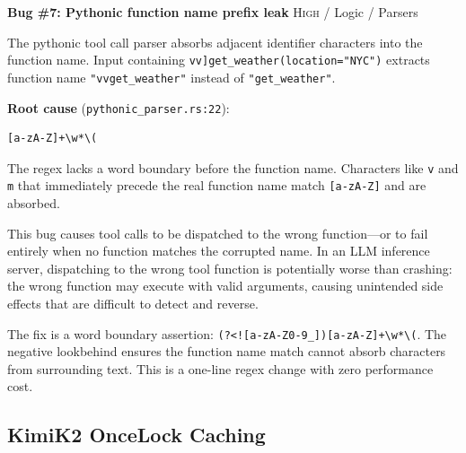 \begin{bugbox}
\textbf{Bug \#7: Pythonic function name prefix leak} \hfill \textsc{High} / Logic / Parsers

The pythonic tool call parser absorbs adjacent identifier characters into the function name. Input containing \texttt{vv]get\_weather(location="NYC")} extracts function name \texttt{"vvget\_weather"} instead of \texttt{"get\_weather"}.

\medskip
\textbf{Root cause} (\texttt{pythonic\_parser.rs:22}):
\begin{verbatim}
[a-zA-Z]+\w*\(
\end{verbatim}
The regex lacks a word boundary before the function name. Characters like \texttt{v} and \texttt{m} that immediately precede the real function name match \texttt{[a-zA-Z]} and are absorbed.
\end{bugbox}

This bug causes tool calls to be dispatched to the wrong function---or to fail entirely when no function matches the corrupted name. In an LLM inference server, dispatching to the wrong tool function is potentially worse than crashing: the wrong function may execute with valid arguments, causing unintended side effects that are difficult to detect and reverse.

The fix is a word boundary assertion: \texttt{(?<![a-zA-Z0-9\_])[a-zA-Z]+\textbackslash w*\textbackslash(}. The negative lookbehind ensures the function name match cannot absorb characters from surrounding text. This is a one-line regex change with zero performance cost.

\subsection{KimiK2 OnceLock Caching}

